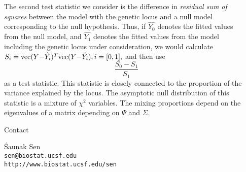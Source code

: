 \documentclass[final,plain]{beamer}
\newcommand{\vect}{\hbox{vec}}
\newlength{\sepwid}
\newlength{\onecolwid}
\begin{document}
\begin{frame}[t]
\begin{columns}[t]
\begin{column}{\onecolwid}
\begin{block}{}
    The second test statistic we consider is the difference in {\em
      residual sum of squares} between the model with the genetic
    locus and a null model corresponding to the null hypothesis.
    Thus, if $\hat{Y_0}$ denotes the fitted values from the null
    model, and $\hat{Y_1}$ denotes the fitted values from the model
    including the genetic locus under consideration, we would
    calculate $S_i = \vect(Y{-}\hat{Y_i})^T \vect(Y{-}\hat{Y_i}),
    i=[0,1],$ and then use \begin{equation} \frac{S_0-S_1}{S_1}
    \end{equation}
    as a test
    statistic.  This statistic is closely connected to the proportion
    of the variance explained by the locus. The asymptotic null
    distribution of this statistic is a mixture of $\chi^2$ variables.
    The mixing proportions depend on the eigenvalues of a matrix
    depending on $\Psi$ and $\Sigma$.
    \end{block}

    \begin{block}{Contact}
      \begin{minipage}{22em}
      \'Saunak Sen \hspace{3em}\\ {\tt sen@biostat.ucsf.edu}\\
      {\tt http://www.biostat.ucsf.edu/sen}
      \end{minipage}
      \begin{minipage}{5em}
      \end{minipage}
    \end{block}
  

\end{column}

\begin{column}{\sepwid}
  \end{column}                 %

\end{columns}

\end{frame}
\end{document}

